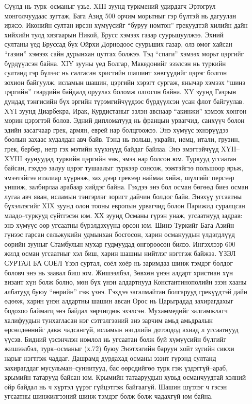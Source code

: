 Сүүлд нь турк–османыг үзье. XIII зуунд туркмений удирдагч Эртогрул монголчуудаас зугтаж, Бага Азид 500 орчим морьтныг гэр бүлтэй нь дагуулан иржээ. Иконийн султан ирсэн хүмүүсийг “буруу номтон” грекуудтэй хилийн дайн хийхийн тулд хязгаарын Никой, Брусс хэмээх газар суурьшуулжээ. Эхний султаны үед Бруссад бүх Ойрхи Дорнодоос суурьших газар, олз омог хайсан “газии” хэмээх сайн дурынхан цутгах болжээ. Тэд “спаги” хэмээх морьт цэргийг бүрдүүлсэн байна. XIY зууны үед Болгар, Македонийг эзэлсэн нь туркийн султанд гэр бүлээс нь салгасан христийн шашинт хөвгүүдийг цэрэг болгон зохион байгуулж, исламын шашин, цэргийн хэрэгт сургаж, янычар хэмээх “шинэ цэргийн” гвардийн байдалд оруулах боломж олгосон байна. XY зуунд Газрын дундад тэнгисийн бүх эргийн түрэмгийчүүдээс бүрдүүлсэн усан флот байгуулав. XYI зуунд Диарбекра, Ирак, Курдистаныг эзлэн авснаар “акинжи” хэмээх хөнгөн морин цэрэгтэй болов. Эдний дипломатууд нь францын урвагчид, санхүүч болон эдийн засагчаар грек, армян, еврей нар болцгоожээ. Энэ хүмүүс эхнэрүүдээ боолын захаас худалдан авч байв. Тэнд нь польш, украйн, немц, итали, грузин, грек, бербер, негр гэх мэтийн хүүхнүүд байдаг байлаа. Энэ эмэгтэйчүүд XYII–XYIII зуунуудад туркийн цэргийн ээж, эмээ нар болсон юм. Туркууд угсаатан байсан, гэхдээ залуу цэрэг тушаалыг туркээр сонсож, ээжтэйгээ польшоор ярьж, эмээтэйгээ италиар хүүрнэж, зах дээр грекээр наймаа хийж, шүлгийг персээр уншиж, залбирлаа арабаар хийдэг байна. Гэхдээ энэ бол осман бөгөөд биеэ осман лугаа авч яван, исламын тэнгэрлэг зоригт дайчин болдог байв.
Энэхүү угсаатны бүхэллэгийг XIX зуунд олон тооны европын урвагчид болон Парижид суралцсан младо–туркууд сүйтгэсэн юм. ХХ зуунд Османы гүрэн унаж, угсаатнууд задрав: энэ хүмүүс өөр угсаатны бүрэлдэхүүнд орсон юм. Шинэ Туркийг Бага Азийн гүнээс гарсан сельжукийн удмынхан босгосон, харин османуудын үлдэгдлүүд өөрийн зууныг Стамбулын мухар гудмуудад өнгөрөөсөн билээ. Ингэхлээр 600 жилд осман угсаатныг хэл биш, харин шашны нийтлэг нэгтгэж байжээ.
ҮЗЭЛ СУРТАЛ БА СОЁЛ
Үзэл суртал, соёл хоёр нь заримдаа шинж тэмдэг болдог боловч энэ нь заавал биш юм. Жишээлбэл, Зөвхөн үнэн алдарт христиан хүн визант хүн болж болно, мөн бүх үнэн алдартнууд Константинополийн эзэн хааны албатууд буюу “өөрийн” гэж үзнэ. Гэхдээ загалмайтан болгарууд грекүүдтэй дайн өдөөж, харин үнэн алдартны шашин авсан Орос нь Царьградад захирагдахыг бодохоо баймагц энэ байдал зөрчигдөж эхэлсэн. Мухаммедийг залгамжлагч халифуудын тунхагласан нэг сэтгэлгээний энэ зарчим амьд амьдралын өрсөлдөөнийг давж чадсангүй, исламын нэгдлийн дотоодод ахиад л угсаатнууд үүсэв. Бидний үзсэнчлэн номлол нь угсаатан болж буй хүмүүсийн бүлгийг жишээлбэл, турк–османыг (х.72) буюу Энэтхэгийн баруун хойт зүгийн сикхи нарыг нэгтгэж чаддаг. Дашрамд дурдахад османы эзэнт гүрэнд султанд захирагддаг мусульман–суннитууд, бас өөрсдийгөө турк гэж үздэггүй–араб, крымийн татарууд байсан юм. Крымийн татааруудын хувьд османчуудтай хэлний ойр байдал нь ч хүртэл үүрэг гүйцэтгэж байгаагүй. Шашин шүтлэг ч гэсэн угсаатны шинжилгээний шинж тэмдэг болж болж чадахгүй юм байна.
